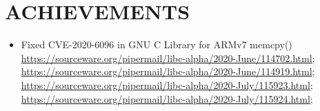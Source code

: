 \documentclass{anisyan-resume}
\begin{document}
	\section{\textbf{ACHIEVEMENTS}}
	\vspace{10pt}
	\renewcommand\labelitemi{{\boldmath$\cdot$}}
	\begin{itemize}[noitemsep, topsep=0pt, parsep=0pt, partopsep=0pt]
		\item \small{Fixed CVE-2020-6096 in GNU C Library for ARMv7 memcpy()} \\
			\href{https://sourceware.org/pipermail/libc-alpha/2020-June/114702.html}{https://sourceware.org/pipermail/libc-alpha/2020-June/114702.html};\\
			\href{https://sourceware.org/pipermail/libc-alpha/2020-June/114919.html}{https://sourceware.org/pipermail/libc-alpha/2020-June/114919.html};\\
			\href{https://sourceware.org/pipermail/libc-alpha/2020-July/115923.html}{https://sourceware.org/pipermail/libc-alpha/2020-July/115923.html};\\
			\href{https://sourceware.org/pipermail/libc-alpha/2020-July/115924.html}{https://sourceware.org/pipermail/libc-alpha/2020-July/115924.html};
	\end{itemize}
\end{document}
